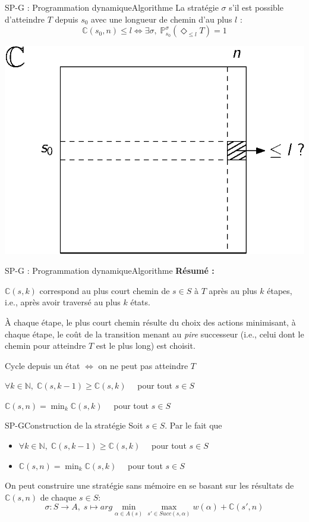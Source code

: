 \documentclass[compress]{beamer}
\begin{document}
\begin{frame}{SP-G : Programmation dynamique}{Algorithme}
La stratégie $\sigma$ s'il est possible d'atteindre $T$ depuis $s_0$ avec une longueur
de chemin d'au plus $l$ :
\[
  \mathbb{C}(s_0, n) \leq l \iff \exists \sigma, \; \mathbb{P}_{s_0}^\sigma(\Diamond_{\leq l} T) = 1
\]
\begin{center}
  \includegraphics[width=0.4\linewidth]{resources/sp-g2}
\end{center}
\end{frame}

\begin{frame}{SP-G : Programmation dynamique}{Algorithme}
  \textbf{\color{fibeamer@orange}Résumé :}
  \begin{itemize}
    \item $\mathbb{C}(s, k)$ correspond au plus court chemin de $s \in S$ à $T$ après \alert{au plus} $k$ étapes, i.e., après avoir traversé \alert{au plus} $k$ états.
    \item \`A chaque étape, le plus court chemin résulte du choix des actions minimisant, à chaque étape, le coût de la transition menant au \textit{pire} successeur (i.e., celui dont le chemin pour atteindre $T$ est le plus long) est choisit.
    \item Cycle depuis un état $\iff$ on ne peut pas atteindre $T$
    { \color{fibeamer@blue}
    \item $\forall k \in \mathbb{N}, \; \mathbb{C}(s, k-1) \geq \mathbb{C}(s, k)\quad$ pour tout $s \in S$
    \item $\mathbb{C}(s, n) = \min_k \mathbb{C}(s, k)\quad$ pour tout $s \in S$
    }
  \end{itemize}
\end{frame}

\begin{frame}{SP-G}{Construction de la stratégie}
Soit $s \in S$. Par le fait que
\begin{itemize}
    \item $\forall k \in \mathbb{N}, \; \mathbb{C}(s, k-1) \geq \mathbb{C}(s, k)\quad$ pour tout $s \in S$
    \item $\mathbb{C}(s, n) = \min_k \mathbb{C}(s, k)\quad$ pour tout $s \in S$
\end{itemize}
On peut construire une stratégie sans mémoire en se basant sur les résultats de $\mathbb{C}(s, n)$ de chaque $s \in S$:
\[
  \sigma : S \rightarrow A, \; s \mapsto arg \min_{\alpha \in A(s)} \max_{s' \in Succ(s, \alpha)} w(\alpha) + \mathbb{C}(s', n)
\]
\end{frame}
\end{document}
